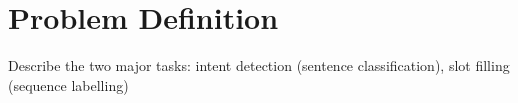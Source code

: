 \section{Problem Definition}
Describe the two major tasks: intent detection (sentence classification), slot filling (sequence labelling)